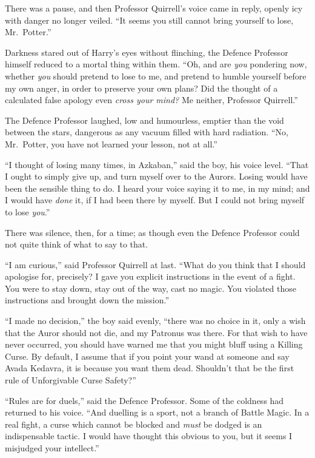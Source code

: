 There was a pause, and then Professor Quirrell's voice came in reply,
openly icy with danger no longer veiled. ``It seems you still cannot
bring yourself to lose, Mr.~Potter.''

Darkness stared out of Harry's eyes without flinching, the Defence
Professor himself reduced to a mortal thing within them. ``Oh, and are
\emph{you} pondering now, whether \emph{you} should pretend to lose to
me, and pretend to humble yourself before my own anger, in order to
preserve your own plans? Did the thought of a calculated false apology
even \emph{cross your mind?} Me neither, Professor Quirrell.''

The Defence Professor laughed, low and humourless, emptier than the void
between the stars, dangerous as any vacuum filled with hard radiation.
``No, Mr.~Potter, you have not learned your lesson, not at all.''

``I thought of losing many times, in Azkaban,'' said the boy, his voice
level. ``That I ought to simply give up, and turn myself over to the
Aurors. Losing would have been the sensible thing to do. I heard your
voice saying it to me, in my mind; and I would have \emph{done} it, if I
had been there by myself. But I could not bring myself to lose
\emph{you}.''

There was silence, then, for a time; as though even the Defence
Professor could not quite think of what to say to that.

``I am curious,'' said Professor Quirrell at last. ``What do you think
that I should apologise for, precisely? I gave you explicit instructions
in the event of a fight. You were to stay down, stay out of the way,
cast no magic. You violated those instructions and brought down the
mission.''

``I made no decision,'' the boy said evenly, ``there was no choice in
it, only a wish that the Auror should not die, and my Patronus was
there. For that wish to have never occurred, you should have warned me
that you might bluff using a Killing Curse. By default, I assume that if
you point your wand at someone and say Avada Kedavra, it is because you
want them dead. Shouldn't that be the first rule of Unforgivable Curse
Safety?''

``Rules are for duels,'' said the Defence Professor. Some of the
coldness had returned to his voice. ``And duelling is a sport, not a
branch of Battle Magic. In a real fight, a curse which cannot be blocked
and \emph{must} be dodged is an indispensable tactic. I would have
thought this obvious to you, but it seems I misjudged your intellect.''

